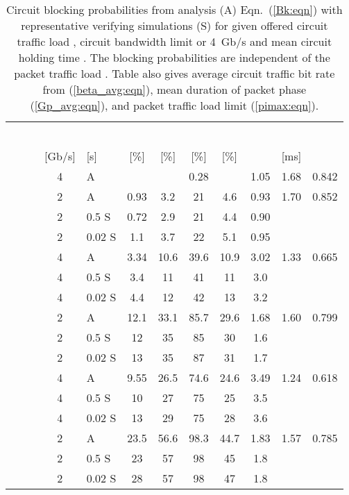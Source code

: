 \documentclass[article]{IEEEtran}
\begin{document}
\begin{table*}[t]
\caption{Circuit blocking probabilities 
from analysis (A) Eqn.~(\ref{Bk:eqn}) with representative
verifying simulations (S) for given offered circuit traffic load ,
circuit bandwidth limit  or 4~Gb/s
and mean circuit holding time .
The blocking probabilities are independent of the packet
traffic load .
Table also gives average circuit traffic bit rate 
from (\ref{beta_avg:eqn}),
mean duration of packet phase  (\ref{Gp_avg:eqn}),
and packet traffic load limit  (\ref{pimax:eqn}).
}
\label{pi_bk:tab}
\begin{center}
\begin{tabular}{|c|c|l|ccc|c|ccc|} \hline         &&&&&&&&& \\
       ~~~~ &  & &    &     &   &   &
              &   &   \\
      & [Gb/s]  & [s] &  [\%] & [\%]     & [\%]      & [\%]  &
              & [ms]  &   \\ \hline
         & 4 & A&   &  &  0.28
          &   & 1.05 & 1.68   & 0.842  \\
       & 2 &  A &  0.93 & 3.2 &  21
          & 4.6  & 0.93 & 1.70  & 0.852  \\
         & 2 & 0.5 S&  0.72  & 2.9 &  21
          & 4.4  & 0.90 &  &   \\
       & 2 & 0.02 S&  1.1 & 3.7 &  22
          & 5.1  & 0.95 &  &   \\ \hline
         & 4 & A&  3.34  &  10.6  &  39.6 & 10.9 &
            3.02  & 1.33  & 0.665  \\
 & 4 & 0.5 S& 3.4 &  11  &  41 & 11 &
            3.0 &  &   \\
          & 4 & 0.02 S&  4.4 &  12  &  42 & 13 &
            3.2 &   &   \\
        & 2 & A&  12.1  &  33.1  &  85.7 & 29.6 &
            1.68  & 1.60  & 0.799  \\
          & 2  &  0.5 S&  12  &  35  &  85 & 30 &
            1.6  &   &   \\
           & 2 &  0.02  S&  13  &  35  &  87 & 31 &
            1.7  &  &    \\ \hline
          & 4 & A&  9.55  & 26.5 &  74.6 & 24.6  &
           3.49  & 1.24   & 0.618  \\
  & 4 & 0.5 S&  10  &  27  &  75 & 25  &
           3.5  &  &   \\
          & 4 & 0.02 S& 13   &  29  &  75 & 28  &
           3.6  &  &   \\
          & 2 & A&  23.5  &  56.6  &  98.3 & 44.7  &
           1.83  & 1.57  & 0.785 \\
          & 2 & 0.5 S&  23  &  57 &  98 & 45  &
           1.8 &   &   \\
           & 2& 0.02 S& 28 & 57  & 98 & 47 &
           1.8  &   &    \\ \hline
\end{tabular}
\end{center}
\end{table*}
\end{document}
